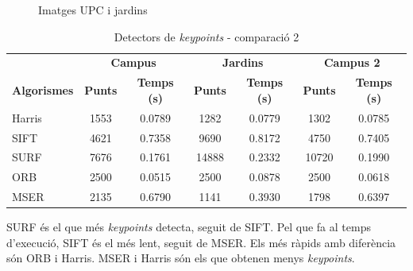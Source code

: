 \begin{figure}[!htb]
				\label{fig:awesome_image3}
			\endminipage
			\caption{Imatges UPC i jardins}
		\end{figure}

		\begin{table}[H]
			\begin{center}
				\begin{tabular}{l | c c | c c | c c}
					& \multicolumn{2}{c|}{\textbf{Campus}} & \multicolumn{2}{c|}{\textbf{Jardins}} & \multicolumn{2}{c}{\textbf{Campus 2}} \\
					\textbf{Algorismes} & \textbf{Punts} & \textbf{Temps (s)} & \textbf{Punts} & \textbf{Temps (s)} & \textbf{Punts} & \textbf{Temps (s)} \\ \hline
					Harris & 1553 & 0.0789 & 1282 & 0.0779 & 1302 & 0.0785 \\
					SIFT & 4621 & 0.7358 & 9690 & 0.8172 & 4750 & 0.7405 \\
					SURF & 7676 & 0.1761 & 14888 & 0.2332 & 10720 & 0.1990 \\
					ORB & 2500 & 0.0515 & 2500 & 0.0878 & 2500 & 0.0618 \\
					MSER & 2135 & 0.6790 & 1141 & 0.3930 & 1798 & 0.6397 \\
				\end{tabular}
			\end{center}
			\caption{Detectors de \textit{keypoints} - comparació 2}
		\end{table}
		\noindent
		SURF és el que més \textit{keypoints} detecta, seguit de SIFT. Pel que fa al temps d'execució, SIFT és el més lent, seguit de MSER. Els més ràpids amb diferència són ORB i Harris.
		MSER i Harris són els que obtenen menys \textit{keypoints}.

